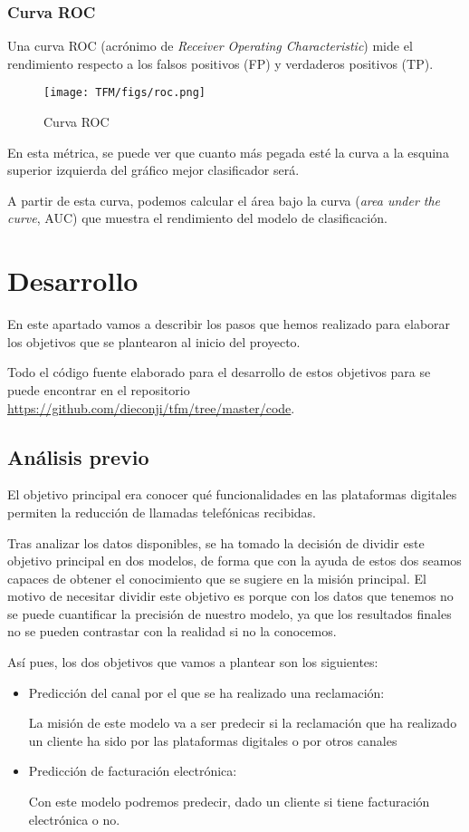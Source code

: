 \subsubsection{Curva ROC}
Una curva ROC (acrónimo de \textit{Receiver Operating Characteristic}) mide el rendimiento respecto a los falsos positivos (FP) y verdaderos positivos (TP).
\begin{figure}[H]
\centerline{\texttt{[image: TFM/figs/roc.png]}}
\caption{Curva ROC}
\label{fig:roc}
\end{figure}

En esta métrica, se puede ver que cuanto más pegada esté la curva a la esquina superior izquierda del gráfico mejor clasificador será.

A partir de esta curva, podemos calcular el área bajo la curva (\textit{area under the curve}, AUC) que muestra el rendimiento del modelo de clasificación.



\section{Desarrollo}

En este apartado vamos a describir los pasos que hemos realizado para elaborar los objetivos que se plantearon al inicio del proyecto.

Todo el código fuente elaborado para el desarrollo de estos objetivos para se puede encontrar en el repositorio  \href{github}{https://github.com/dieconji/tfm/tree/master/code}.


\subsection{Análisis previo}
El objetivo principal era conocer qué funcionalidades en las plataformas digitales permiten la reducción de llamadas telefónicas recibidas.

Tras analizar los datos disponibles, se ha tomado la decisión de dividir este objetivo principal en dos modelos, de forma que con la ayuda de estos dos seamos capaces de obtener el conocimiento que se sugiere en la misión principal.
El motivo de necesitar dividir este objetivo es porque con los datos que tenemos no se puede cuantificar la precisión de nuestro modelo, ya que los resultados finales no se pueden contrastar con la realidad si no la conocemos.

Así pues, los dos objetivos que vamos a plantear son los siguientes:
\begin{itemize}
    \item Predicción del canal por el que se ha realizado una reclamación:
    
    La misión de este modelo va a ser predecir si la reclamación que ha realizado un cliente ha sido por las plataformas digitales o por otros canales
    \item Predicción de facturación electrónica:
    
    Con este modelo podremos predecir, dado un cliente si tiene facturación electrónica o no.
\end{itemize}


